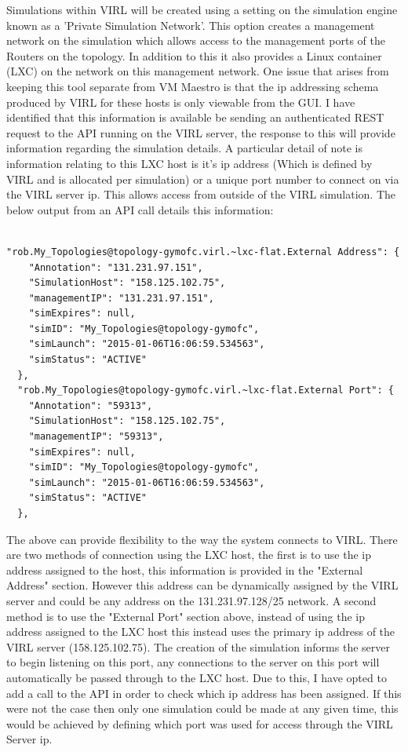 \documentclass[11pt]{report}
\begin{document}
Simulations within VIRL will be created using a setting on the simulation engine known as a 'Private Simulation Network'. This option creates a management network on the simulation which allows access to the management ports of the Routers on the topology. In addition to this it also provides a Linux container (LXC) on the network on this management network. One issue that arises from keeping this tool separate from VM Maestro is that the ip addressing schema produced by VIRL for these hosts is only viewable from the GUI. I have identified that this information is available be sending an authenticated REST request to the API running on the VIRL server, the response to this will provide information regarding the simulation details. A particular detail of note is information relating to this LXC host is it's ip address (Which is defined by VIRL and is allocated per simulation) or a unique port number to connect on via the VIRL server ip. This allows access from outside of the VIRL simulation. The below output from an API call details this information:

\begin{lstlisting}

"rob.My_Topologies@topology-gymofc.virl.~lxc-flat.External Address": {
    "Annotation": "131.231.97.151",
    "SimulationHost": "158.125.102.75",
    "managementIP": "131.231.97.151",
    "simExpires": null,
    "simID": "My_Topologies@topology-gymofc",
    "simLaunch": "2015-01-06T16:06:59.534563",
    "simStatus": "ACTIVE"
  },
  "rob.My_Topologies@topology-gymofc.virl.~lxc-flat.External Port": {
    "Annotation": "59313",
    "SimulationHost": "158.125.102.75",
    "managementIP": "59313",
    "simExpires": null,
    "simID": "My_Topologies@topology-gymofc",
    "simLaunch": "2015-01-06T16:06:59.534563",
    "simStatus": "ACTIVE"
  },

\end{lstlisting}

The above can provide flexibility to the way the system connects to VIRL. There are two methods of connection using the LXC host, the first is to use the ip address assigned to the host, this information is provided in the "External Address" section. However this address can be dynamically assigned by the VIRL server and could be any address on the 131.231.97.128/25 network. A second method is to use the "External Port" section above, instead of using the ip address assigned to the LXC host this instead uses the primary ip address of the VIRL server (158.125.102.75). The creation of the simulation informs the server to begin listening on this port, any connections to the server on this port will automatically be passed through to the LXC host. Due to this, I have opted to add a call to the API in order to check which ip address has been assigned. If this were not the case then only one simulation could be made at any given time, this would be achieved by defining which port was used for access through the VIRL Server ip.
\end{document}
